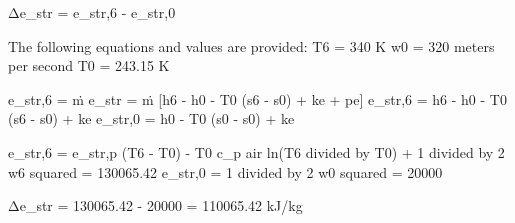 Δe_str = e_str,6 - e_str,0  

The following equations and values are provided:  
T6 = 340 K  
w0 = 320 meters per second  
T0 = 243.15 K  

e_str,6 = ṁ e_str = ṁ [h6 - h0 - T0 (s6 - s0) + ke + pe]  
e_str,6 = h6 - h0 - T0 (s6 - s0) + ke  
e_str,0 = h0 - T0 (s0 - s0) + ke  

e_str,6 = e_str,p (T6 - T0) - T0 c_p air ln(T6 divided by T0) + 1 divided by 2 w6 squared = 130065.42  
e_str,0 = 1 divided by 2 w0 squared = 20000  

Δe_str = 130065.42 - 20000 = 110065.42 kJ/kg